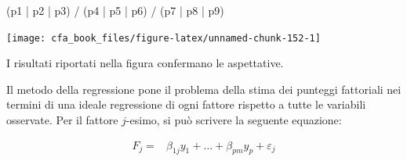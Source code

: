 \documentclass[
  11pt,
]{krantz}
\makeatletter
\newenvironment{Shaded}{\begin{snugshade}}{\end{snugshade}}
\newcommand{\AttributeTok}[1]{\textcolor[rgb]{0.61,0.61,0.61}{#1}}
\newcommand{\DecValTok}[1]{\textcolor[rgb]{0.06,0.06,0.06}{#1}}
\newcommand{\FloatTok}[1]{\textcolor[rgb]{0.06,0.06,0.06}{#1}}
\newcommand{\FunctionTok}[1]{\textcolor[rgb]{0,0,0}{#1}}
\newcommand{\NormalTok}[1]{#1}
\newcommand{\OtherTok}[1]{\textcolor[rgb]{0.37,0.37,0.37}{#1}}
\newcommand{\SpecialCharTok}[1]{\textcolor[rgb]{0,0,0}{#1}}
\newenvironment{kframe}{%
\medskip{}
\setlength{\fboxsep}{.8em}
 \def\at@end@of@kframe{}%
 \ifinner\ifhmode%
  \def\at@end@of@kframe{\end{minipage}}%
  \begin{minipage}{\columnwidth}%
 \fi\fi%
 \def\FrameCommand##1{\hskip\@totalleftmargin \hskip-\fboxsep
 \colorbox{shadecolor}{##1}\hskip-\fboxsep
     \hskip-\linewidth \hskip-\@totalleftmargin \hskip\columnwidth}%
 \MakeFramed {\advance\hsize-\width
   \@totalleftmargin\z@ \linewidth\hsize
   \@setminipage}}%
 {\par\unskip\endMakeFramed%
 \at@end@of@kframe}
\renewenvironment{Shaded}{\begin{kframe}}{\end{kframe}}
\theoremstyle{definition}
\theoremstyle{definition}
\theoremstyle{definition}
\theoremstyle{definition}
\theoremstyle{remark}
\makeatother
\begin{document}
\begin{Shaded}
\end{Shaded}

\begin{Shaded}
\begin{Highlighting}[]
\NormalTok{(p1 }\SpecialCharTok{|}\NormalTok{ p2 }\SpecialCharTok{|}\NormalTok{ p3) }\SpecialCharTok{/}
\NormalTok{  (p4 }\SpecialCharTok{|}\NormalTok{ p5 }\SpecialCharTok{|}\NormalTok{ p6) }\SpecialCharTok{/}
\NormalTok{  (p7 }\SpecialCharTok{|}\NormalTok{ p8 }\SpecialCharTok{|}\NormalTok{ p9)}
\end{Highlighting}
\end{Shaded}

\begin{center}\texttt{[image: cfa\_book\_files/figure-latex/unnamed-chunk-152-1]} \end{center}

I risultati riportati nella figura confermano le aspettative.

Il metodo della regressione pone il problema della stima dei punteggi fattoriali nei termini di una ideale regressione di ogni fattore rispetto a tutte le variabili osservate. Per il fattore \(j\)-esimo, si può scrivere la seguente equazione:

\[
\begin{aligned}
F_j =& \beta_{1j}y_1 + \dots + \beta_{pm}y_p + \varepsilon_j
\end{aligned}
\]
\end{document}
